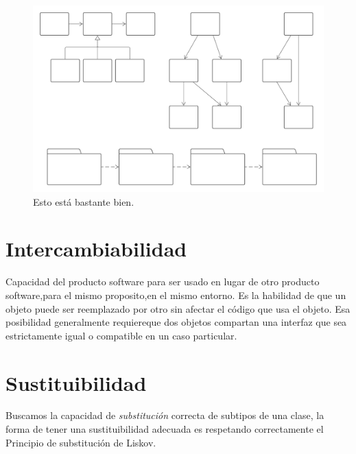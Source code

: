 \documentclass[a4paper,11pt]{article}
\begin{document}
\begin{figure}[!h]
    \centering
    \includegraphics[scale=.5]{assets/gc1.png}
    \caption{Esto está bastante bien.}
\end{figure}


\section{Intercambiabilidad}
Capacidad del producto software para ser usado en lugar de otro producto
software,para el mismo proposito,en el mismo entorno.
Es la habilidad de que un objeto puede ser reemplazado por otro sin afectar el código que usa el objeto.
Esa posibilidad generalmente requiereque dos objetos compartan
una interfaz que sea estrictamente igual o compatible en un caso particular.

\section{Sustituibilidad}
Buscamos la capacidad de \emph{substitución} correcta de subtipos de una clase, 
la forma de tener una sustituibilidad adecuada es respetando correctamente el 
Principio de substitución de Liskov.

{}

\end{document}

